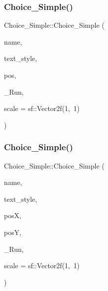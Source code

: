 \subsubsection{\texorpdfstring{Choice\+\_\+\+Simple()}{Choice\_Simple()}\hspace{0.1cm}{\footnotesize\ttfamily [1/2]}}
{\footnotesize\ttfamily Choice\+\_\+\+Simple\+::\+Choice\+\_\+\+Simple (\begin{DoxyParamCaption}\item[{const char $\ast$}]{name,  }\item[{const sf\+::\+Text \&}]{text\+\_\+style,  }\item[{sf\+::\+Vector2f}]{pos,  }\item[{std\+::function$<$ \hyperlink{_globals_8h_a3d5776bab98402b03be09156bacf4f68}{Screens}(sf\+::\+Render\+Target \&, \hyperlink{class_go___solver}{Go\+\_\+\+Solver} \&)$>$}]{\+\_\+\+Run,  }\item[{sf\+::\+Vector2f}]{scale = {\ttfamily sf\+:\+:Vector2f(1,~1)} }\end{DoxyParamCaption})}

\mbox{\label{class_choice___simple_a00412cfa29b144f0aca041b93fab4b26}} 
\subsubsection{\texorpdfstring{Choice\+\_\+\+Simple()}{Choice\_Simple()}\hspace{0.1cm}{\footnotesize\ttfamily [2/2]}}
{\footnotesize\ttfamily Choice\+\_\+\+Simple\+::\+Choice\+\_\+\+Simple (\begin{DoxyParamCaption}\item[{const char $\ast$}]{name,  }\item[{const sf\+::\+Text \&}]{text\+\_\+style,  }\item[{float}]{posX,  }\item[{float}]{posY,  }\item[{std\+::function$<$ \hyperlink{_globals_8h_a3d5776bab98402b03be09156bacf4f68}{Screens}(sf\+::\+Render\+Target \&, \hyperlink{class_go___solver}{Go\+\_\+\+Solver} \&)$>$}]{\+\_\+\+Run,  }\item[{sf\+::\+Vector2f}]{scale = {\ttfamily sf\+:\+:Vector2f(1,~1)} }\end{DoxyParamCaption})}

